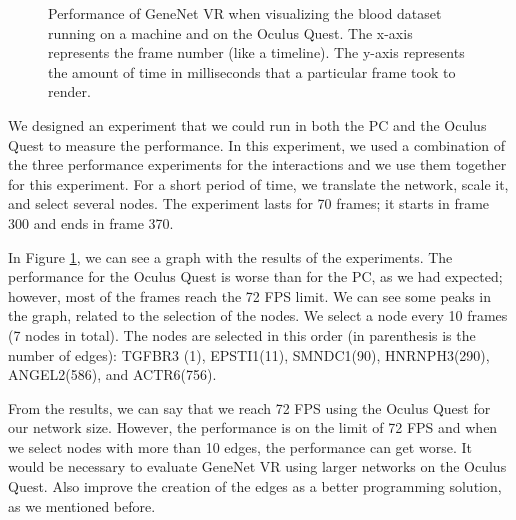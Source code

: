 \begin{figure}[h!]
  \centering
  \begin{minipage}{.8\textwidth}
  \end{minipage}
\caption{Performance of GeneNet VR when visualizing the blood dataset running on a machine and on the Oculus Quest. The x-axis represents the frame number (like a timeline). The y-axis represents the amount of time in milliseconds that a particular frame took to render.}
\label{fig:pc_vs_oculus}
\end{figure}

We designed an experiment that we could run in both the PC and the Oculus Quest to measure the performance. In this experiment, we used a combination of the three performance experiments for the interactions and we use them together for this experiment. For a short period of time, we translate the network, scale it, and select several nodes. The experiment lasts for 70 frames; it starts in frame 300 and ends in frame 370.

In Figure \ref{fig:pc_vs_oculus}, we can see a graph with the results of the experiments. The performance for the Oculus Quest is worse than for the PC, as we had expected; however, most of the frames reach the 72 FPS limit. We can see some peaks in the graph, related to the selection of the nodes. We select a node every 10 frames (7 nodes in total). The nodes are selected in this order (in parenthesis is the number of edges): TGFBR3 (1), EPSTI1(11), SMNDC1(90), HNRNPH3(290), ANGEL2(586), and ACTR6(756).

From the results, we can say that we reach 72 FPS using the Oculus Quest for our network size. However, the performance is on the limit of 72 FPS and when we select nodes with more than 10 edges, the performance can get worse. It would be necessary to evaluate GeneNet VR using larger networks on the Oculus Quest. Also improve the creation of the edges as a better programming solution, as we mentioned before.

